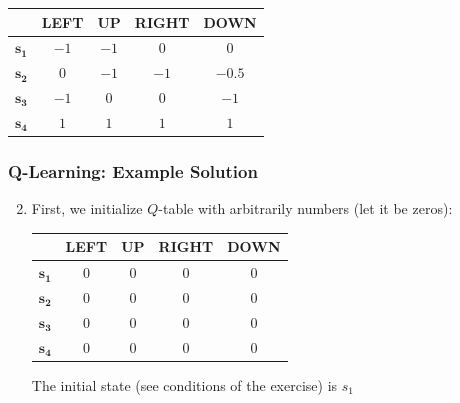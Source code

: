 \begin{frame}[<+->]
\begin{enumerate}
\begin{itemize}
						\begin{table}[!h]
							\scriptsize
							\begin{tabular}{c|c|c|c|c|}
								\cline{2-5}
								& \textbf{LEFT} & \textbf{UP} & \textbf{RIGHT} &
								\textbf{DOWN} \\ \hline
								\multicolumn{1}{|c|}{$ \mathbf{s_1} $} & $ -1 $ & $ -1 $
								& $ 0 $ & $ 0 $ \\ \hline
								\multicolumn{1}{|c|}{$ \mathbf{s_2} $} & $ 0 $ & $ -1 $
								& $ -1 $ & $ -0.5 $ \\ \hline
								\multicolumn{1}{|c|}{$ \mathbf{s_3} $} & $ -1 $ & $ 0 $    
								& $ 0 $ & $ -1 $ \\ \hline
								\multicolumn{1}{|c|}{$ \mathbf{s_4} $} & $ 1 $ & $ 1 $    
								& $ 1 $ & $ 1 $ \\ \hline
							\end{tabular}
						\end{table}
			  \end{itemize}
	\end{enumerate}
\end{frame}

\begin{frame}[<+->]
	\frametitle{Q-Learning: Example Solution}
	
	\vspace{0.4cm}
	
	\begin{enumerate}
		\setcounter{enumi}{1}
		\item First, we initialize $ Q $-table with arbitrarily numbers (let it be zeros):
			  
			  \begin{table}[!h]
				  \begin{tabular}{c|c|c|c|c|}
					  \cline{2-5}
					  & \textbf{LEFT} & \textbf{UP} & \textbf{RIGHT} &
					  \textbf{DOWN} \\ \hline
					  \multicolumn{1}{|c|}{$ \mathbf{s_1} $} & $ 0 $ & $ 0 $
					  & $ 0 $ & $ 0 $ \\ \hline
					  \multicolumn{1}{|c|}{$ \mathbf{s_2} $} & $ 0 $ & $ 0 $
					  & $ 0 $ & $ 0 $ \\ \hline
					  \multicolumn{1}{|c|}{$ \mathbf{s_3} $} & $ 0 $ & $ 0 $    
					  & $ 0 $ & $ 0 $ \\ \hline
					  \multicolumn{1}{|c|}{$ \mathbf{s_4} $} & $ 0 $ & $ 0 $    
					  & $ 0 $ & $ 0 $ \\ \hline
				  \end{tabular}
			  \end{table}
			  
			  \vspace{0.4cm}
			  
			  The initial state (see conditions of the exercise) is $ s_1 $
	\end{enumerate}
\end{frame}


